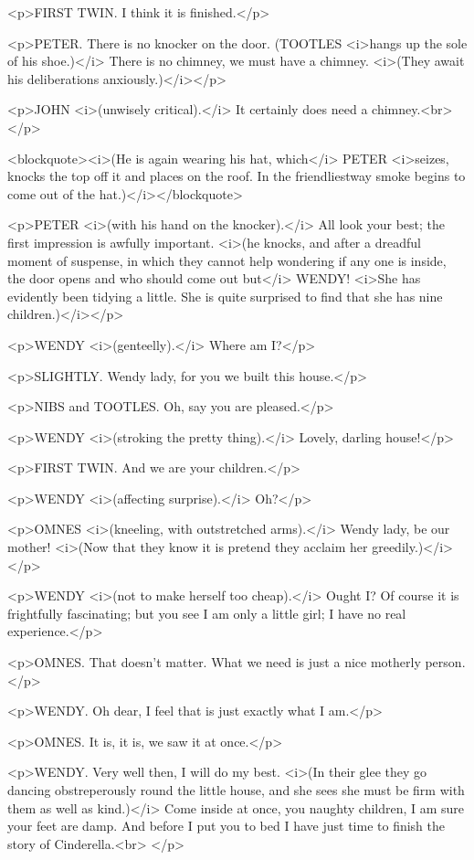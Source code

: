 <p>FIRST TWIN. I think it is finished.</p>

<p>PETER. There is no knocker on the door. (TOOTLES <i>hangs up the
sole of his shoe.)</i> There is no chimney, we must have a chimney.
<i>(They await his deliberations anxiously.)</i></p>

<p>JOHN <i>(unwisely critical).</i> It certainly does need a
chimney.<br>
</p>

<blockquote><i>(He is again wearing his hat, which</i> PETER
<i>seizes, knocks the top off it and places on the roof. In the
friendliestway smoke begins to come out of the hat.)</i></blockquote>

<p>PETER <i>(with his hand on the knocker).</i> All look your best;
the first impression is awfully important. <i>(he knocks, and after a
dreadful moment of suspense, in which they cannot help wondering if
any one is inside, the door opens and who should come out but</i>
WENDY! <i>She has evidently been tidying a little. She is quite
surprised to find that she has nine children.)</i></p>

<p>WENDY <i>(genteelly).</i> Where am I?</p>

<p>SLIGHTLY. Wendy lady, for you we built this house.</p>

<p>NIBS and TOOTLES. Oh, say you are pleased.</p>

<p>WENDY <i>(stroking the pretty thing).</i> Lovely, darling
house!</p>

<p>FIRST TWIN. And we are your children.</p>

<p>WENDY <i>(affecting surprise).</i> Oh?</p>

<p>OMNES <i>(kneeling, with outstretched arms).</i> Wendy lady, be
our mother! <i>(Now that they know it is pretend they acclaim her
greedily.)</i></p>

<p>WENDY <i>(not to make herself too cheap).</i> Ought I? Of course
it is frightfully fascinating; but you see I am only a little girl; I
have no real experience.</p>

<p>OMNES. That doesn't matter. What we need is just a nice motherly
person.</p>

<p>WENDY. Oh dear, I feel that is just exactly what I am.</p>

<p>OMNES. It is, it is, we saw it at once.</p>

<p>WENDY. Very well then, I will do my best. <i>(In their glee they
go dancing obstreperously round the little house, and she sees she
must be firm with them as well as kind.)</i> Come inside at once, you
naughty children, I am sure your feet are damp. And before I put you
to bed I have just time to finish the story of Cinderella.<br>
</p>

